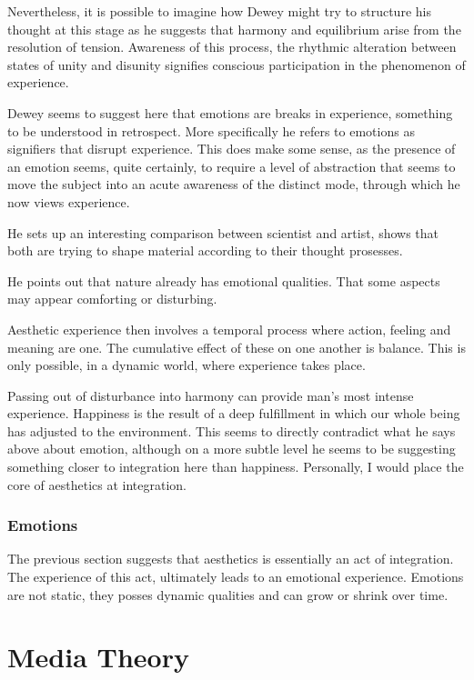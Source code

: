 \documentclass[11pt]{article}
\begin{document}
Nevertheless, it is possible to imagine how Dewey might try to
structure his thought at this stage as he suggests that harmony and
equilibrium arise from the resolution of tension. Awareness of this
process, the rhythmic alteration between states of unity and disunity
signifies conscious participation in the phenomenon of experience. 

Dewey seems to suggest here that emotions are breaks in experience,
something to be understood in retrospect. More specifically he refers
to emotions as signifiers that disrupt experience. This does make some
sense, as the presence of an emotion seems, quite certainly, to
require a level of abstraction that seems to move the subject into an
acute awareness of the distinct mode, through which he now views experience. 

He sets up an interesting comparison between scientist and artist,
shows that both are trying to shape material according to their thought prosesses. 

He points out that nature already has emotional qualities. That some
aspects may appear comforting or disturbing. 

Aesthetic experience then involves a temporal process where action,
feeling and meaning are one.  The cumulative effect of these on one
another is balance. This is only possible, in a dynamic world, where
experience takes place. 

Passing out of disturbance into harmony can provide man's most intense
experience. Happiness is the result of a deep fulfillment in which our
whole being has adjusted to the environment. This seems to directly
contradict what he says above about emotion, although on a more subtle
level he seems to be suggesting something closer to integration here
than happiness. Personally, I would place the core of aesthetics at integration. 

\subsubsection{Emotions}
\label{sec:org133206f}

The previous section suggests that aesthetics is essentially an act of
integration. The experience of this act, ultimately leads to an
emotional experience. Emotions are not static, they posses dynamic
qualities and can grow or shrink over time. 







\section{Media Theory}
\label{sec:org1e83fec}
\end{document}
